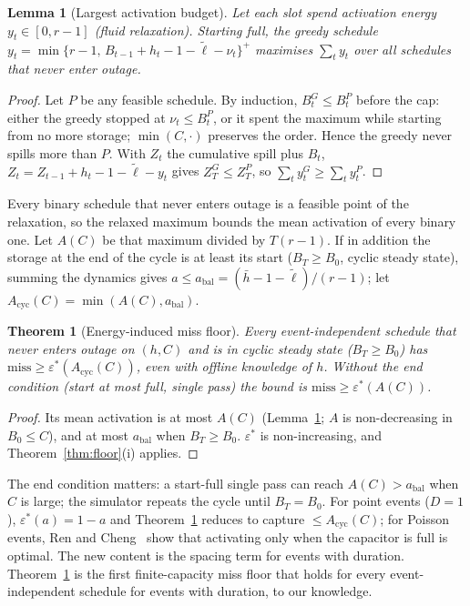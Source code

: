 \documentclass[lettersize,journal]{IEEEtran}
\newtheorem{theorem}{Theorem}
\newtheorem{lemma}{Lemma}
\theoremstyle{definition}
\theoremstyle{remark}
\newcommand{\eps}{\varepsilon}
\newcommand{\lt}{\tilde{\ell}}
\begin{document}
\begin{lemma}[Largest activation budget]\label{lem:greedy}
Let each slot spend activation energy $y_t\in[0,r-1]$ (fluid relaxation). Starting full, the greedy schedule $y_t=\min\{r-1,\,B_{t-1}+h_t-1-\lt-\nu_t\}^+$ maximises $\sum_ty_t$ over all schedules that never enter outage.
\end{lemma}
\begin{proof}
Let $P$ be any feasible schedule. By induction, $B^G_t\le B^P_t$ before the cap: either the greedy stopped at $\nu_t\le B^P_t$, or it spent the maximum while starting from no more storage; $\min(C,\cdot)$ preserves the order. Hence the greedy never spills more than $P$. With $Z_t$ the cumulative spill plus $B_t$, $Z_t=Z_{t-1}+h_t-1-\lt-y_t$ gives $Z^G_T\le Z^P_T$, so $\sum_ty^G_t\ge\sum_ty^P_t$.
\end{proof}
\noindent Every binary schedule that never enters outage is a feasible point of the relaxation, so the relaxed maximum bounds the mean activation of every binary one. Let $A(C)$ be that maximum divided by $T(r-1)$. If in addition the storage at the end of the cycle is at least its start ($B_T\ge B_0$, cyclic steady state), summing the dynamics gives $a\le a_{\mathrm{bal}}=(\bar h-1-\lt)/(r-1)$; let $A_{\mathrm{cyc}}(C)=\min(A(C),a_{\mathrm{bal}})$.

\begin{theorem}[Energy-induced miss floor]\label{thm:energy}
Every event-independent schedule that never enters outage on $(h,C)$ and is in cyclic steady state ($B_T\ge B_0$) has $\mathrm{miss}\ge\eps^*(A_{\mathrm{cyc}}(C))$, even with offline knowledge of $h$. Without the end condition (start at most full, single pass) the bound is $\mathrm{miss}\ge\eps^*(A(C))$.
\end{theorem}
\begin{proof}
Its mean activation is at most $A(C)$ (Lemma~\ref{lem:greedy}; $A$ is non-decreasing in $B_0\le C$), and at most $a_{\mathrm{bal}}$ when $B_T\ge B_0$. $\eps^*$ is non-increasing, and Theorem~\ref{thm:floor}(i) applies.
\end{proof}
\noindent The end condition matters: a start-full single pass can reach $A(C)>a_{\mathrm{bal}}$ when $C$ is large; the simulator repeats the cycle until $B_T=B_0$. For point events ($D=1$), $\eps^*(a)=1-a$ and Theorem~\ref{thm:energy} reduces to capture $\le A_{\mathrm{cyc}}(C)$; for Poisson events, Ren and Cheng~\cite{ren2015p2p} show that activating only when the capacitor is full is optimal. The new content is the spacing term for events with duration. Theorem~\ref{thm:energy} is the first finite-capacity miss floor that holds for every event-independent schedule for events with duration, to our knowledge.
\end{document}
